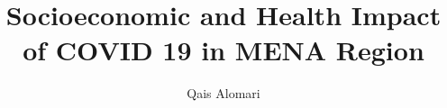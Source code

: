 \documentclass[a4paper]{report}
\begin{document}
\title{Socioeconomic and Health Impact of COVID 19 in MENA Region} %
\author{Qais Alomari} %
\degree{\msc}{\majords} %

\supervisoruni{\psut}







\end{document}
